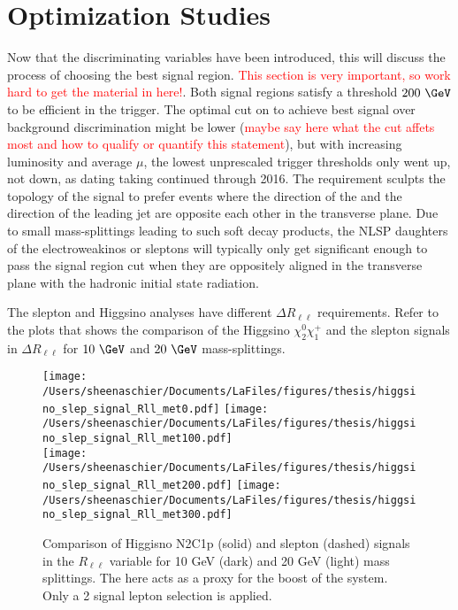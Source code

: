 \section{Optimization Studies}
Now that the discriminating variables have been introduced, this will discuss the process of choosing the best signal region.  \textcolor{red}{This section is very important, so work hard to get the material in here!}. Both signal regions satisfy a \met{} threshold $200~\GeV$ \met{} to be efficient in the \met{} trigger.  The optimal cut on \met{} to achieve best signal over background discrimination might be lower (\textcolor{red}{maybe say here what the \met{} cut affets most and how to qualify or quantify this statement}), but with increasing luminosity and average $\mu$, the lowest unprescaled \met{} trigger thresholds only went up, not down, as dating taking continued through 2016.  The \met{} requirement sculpts the topology of the signal to prefer events where the direction of the \met and the direction of the leading jet are opposite each other in the transverse plane.  Due to small mass-splittings leading to such soft decay products, the NLSP daughters of the electroweakinos or sleptons will typically only get significant enough \met{} to pass the \met{} signal region cut when they are oppositely aligned in the transverse plane with the hadronic initial state radiation.  

The slepton and Higgsino analyses have different $\Delta R_{\ell\ell}$ requirements.  Refer to the plots that shows the comparison of the Higgsino $\chi_2^0\chi_1^+$ and the slepton signals in $\Delta R_{\ell\ell}$ for $10~\GeV$ and $20~\GeV$ mass-splittings.
  \begin{figure}[tbp]
     \texttt{[image: /Users/sheenaschier/Documents/LaFiles/figures/thesis/higgsino\_slep\_signal\_Rll\_met0.pdf]}
       \texttt{[image: /Users/sheenaschier/Documents/LaFiles/figures/thesis/higgsino\_slep\_signal\_Rll\_met100.pdf]}\\
     \texttt{[image: /Users/sheenaschier/Documents/LaFiles/figures/thesis/higgsino\_slep\_signal\_Rll\_met200.pdf]}
     \texttt{[image: /Users/sheenaschier/Documents/LaFiles/figures/thesis/higgsino\_slep\_signal\_Rll\_met300.pdf]}\\
   \caption{Comparison of Higgisno N2C1p (solid) and slepton (dashed) signals in the $R_{\ell\ell}$ variable for 10 GeV (dark) and 20 GeV (light) mass splittings. The \met{} here acts as a proxy for the boost of the system. Only a 2 signal lepton selection is applied.}
   \label{fig:Rll_signals only}
 \end{figure}
 
